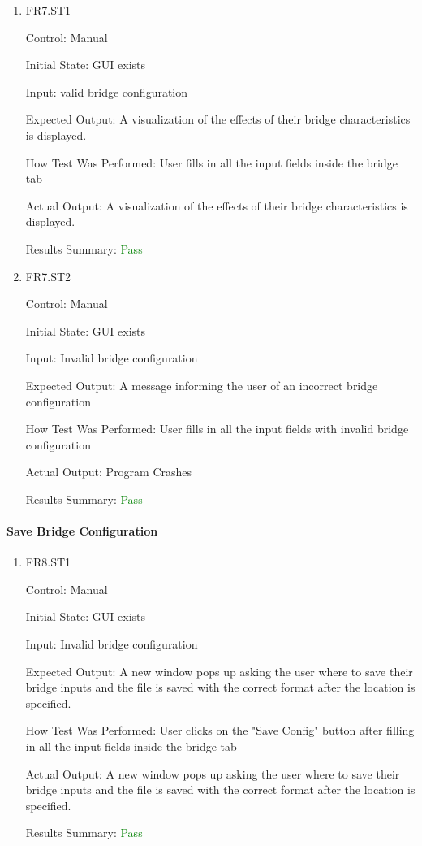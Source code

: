 \documentclass[12pt, titlepage]{article}
\begin{document}
\begin{enumerate}
  
  \item{FR7.ST1\\}
  
  Control: Manual
  
  Initial State: GUI exists
  
  Input: valid bridge configuration
  
  Expected Output: A visualization of the effects of their bridge characteristics is displayed. 
  
  How Test Was Performed: User fills in all the input fields inside the bridge tab
  
  Actual Output: A visualization of the effects of their bridge characteristics is displayed.
  
  Results Summary: \textcolor{green} {Pass}
  
  \item{FR7.ST2\\}
  
  Control: Manual
  
  Initial State: GUI exists
  
  Input: Invalid bridge configuration
  
   Expected Output: A message informing the user of an incorrect bridge configuration
  
  How Test Was Performed: User fills in all the input fields with invalid bridge configuration

  Actual Output: Program Crashes
    
  Results Summary: \textcolor{green} {Pass} 
  
\end{enumerate}

\paragraph{Save Bridge Configuration}

\begin{enumerate}

  \item{FR8.ST1\\}
  
  Control: Manual
  
  Initial State: GUI exists
  
  Input: Invalid bridge configuration
  
  Expected Output: A new window pops up asking the user where to save their bridge inputs and the file is saved with the correct format after the location is specified. 
  
  How Test Was Performed: User clicks on the "Save Config" button after filling in all the input fields inside the bridge tab

  Actual Output: A new window pops up asking the user where to save their bridge inputs and the file is saved with the correct format after the location is specified.
    
  Results Summary: \textcolor{green} {Pass}

\end{enumerate}
\end{document}
